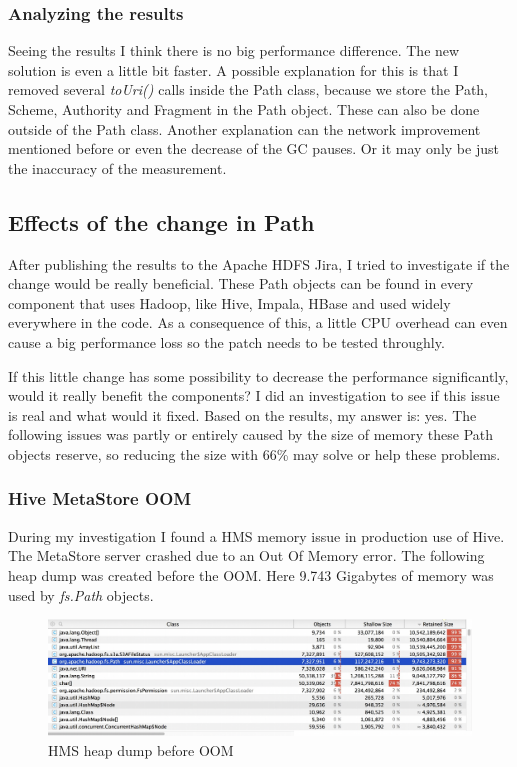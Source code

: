 \subsubsection{Analyzing the results}
Seeing the results I think there is no big performance difference. The new solution is even a little bit faster. A possible explanation for this is that I removed several \textit{toUri()} calls inside the Path class, because we store the Path, Scheme, Authority and Fragment in the Path object. These can also be done outside of the Path class. Another explanation can the network improvement mentioned before or even the decrease of the GC pauses. Or it may only be just the inaccuracy of the measurement.

\subsection{Effects of the change in Path}
After publishing the results to the Apache HDFS Jira, I tried to investigate if the change would be really beneficial. These Path objects can be found in every component that uses Hadoop, like Hive, Impala, HBase \etc and used widely everywhere in the code. As a consequence of this, a little CPU overhead can even cause a big performance loss so the patch needs to be tested throughly. 

If this little change has some possibility to decrease the performance significantly, would it really benefit the components? I did an investigation to see if this issue is real and what would it fixed. Based on the results, my answer is: yes. The following issues was partly or entirely caused by the size of memory these Path objects reserve, so reducing the size with 66\% may solve or help these problems.

\subsubsection{Hive MetaStore OOM}
During my investigation I found a HMS memory issue in production use of Hive. The MetaStore server crashed due to an Out Of Memory error. The following heap dump was created before the OOM. Here 9.743 Gigabytes of memory was used by \textit{fs.Path} objects.

\begin{figure}[H]
	\includegraphics[width=150mm, keepaspectratio]{figures/hms_heapdump.png}
	\centering
	\caption{HMS heap dump before OOM}
\end{figure}

